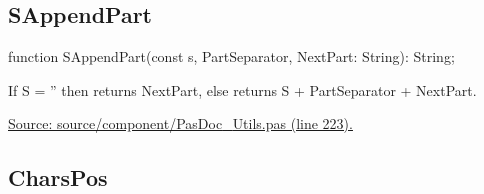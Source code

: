 \documentclass{report}
\newif\ifpdf
\begin{document}
\subsection*{SAppendPart}
\fi
\label{PasDoc_Utils-SAppendPart}
\begin{list}{}{
\setlength{\itemindent}{0cm}
\setlength{\listparindent}{0cm}
\setlength{\leftmargin}{\evensidemargin}
\addtolength{\leftmargin}{\tmplength}
\settowidth{\labelsep}{X}
\addtolength{\leftmargin}{\labelsep}
\setlength{\labelwidth}{\tmplength}
}
\item[\textbf{Declaration}\hfill]
\ifpdf
\begin{flushleft}
\fi
\begin{ttfamily}
function SAppendPart(const s, PartSeparator, NextPart: String): String;\end{ttfamily}

\ifpdf
\end{flushleft}
\fi

\par
\item[\textbf{Description}]
If S = '' then returns NextPart, else returns S + PartSeparator + NextPart.\par
\href{https://github.com/pasdoc/pasdoc/blob/master/source/component/PasDoc_Utils.pas#L223}{Source: source/component/PasDoc{\_}Utils.pas (line 223).}

\end{list}
\ifpdf
\subsection*{\large{\textbf{CharsPos}}\normalsize\hspace{1ex}\hrulefill}
\else
\end{document}
